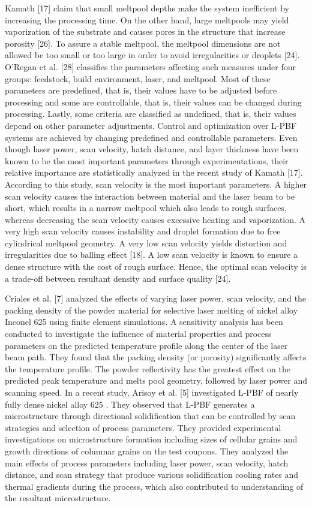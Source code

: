 \documentclass[10pt]{article}
\begin{document}
Kamath [17] claim that small meltpool depths make the system inefficient by increasing the processing time. On the other hand, large meltpools may yield vaporization of the substrate and causes pores in the structure that increase porosity [26]. To assure a stable meltpool, the meltpool dimensions are not allowed be too small or too large in order to avoid irregularities or droplets [24]. O’Regan et al. [28] classifies the parameters affecting such measures under four groups: feedstock, build environment, laser, and meltpool. Most of these parameters are predefined, that is, their values have to be adjusted before processing and some are controllable, that is, their values can be changed during processing. Lastly, some criteria are classified as undefined, that is, their values depend on other parameter adjustments. Control and optimization over L-PBF systems are achieved by changing predefined and controllable parameters. Even though laser power, scan velocity, hatch distance, and layer thickness have been known to be the most important parameters through experimentations, their relative importance are statistically analyzed in the recent study of Kamath [17]. According to this study, scan velocity is the most important parameters. A higher scan velocity causes the interaction between material and the laser beam to be short, which results in a narrow meltpool which also leads to rough surfaces, whereas decreasing the scan velocity causes excessive heating and vaporization. A very high scan velocity causes instability and droplet formation due to free cylindrical meltpool geometry. A very low scan velocity yields distortion and irregularities due to balling effect [18]. A low scan velocity is known to ensure a dense structure with the cost of rough surface. Hence, the optimal scan velocity is a trade-off between resultant density and surface quality [24].

Criales et al. [7] analyzed the effects of varying laser power, scan velocity, and the packing density of the powder material for selective laser melting of nickel alloy Inconel 625 using finite element simulations. A sensitivity analysis has been conducted to investigate the influence of material properties and process parameters on the predicted temperature profile along the center of the laser beam path. They found that the packing density (or porosity) significantly affects the temperature profile. The powder reflectivity has the greatest effect on the predicted peak temperature and melts pool geometry, followed by laser power and scanning speed. In a recent study, Arisoy et al. [5] investigated L-PBF of nearly fully dense nickel alloy 625 . They observed that L-PBF generates a microstructure through directional solidification that can be controlled by scan strategies and selection of process parameters. They provided experimental investigations on microstructure formation including sizes of cellular grains and growth directions of columnar grains on the test coupons. They analyzed the main effects of process parameters including laser power, scan velocity, hatch distance, and scan strategy that produce various solidification cooling rates and thermal gradients during the process, which also contributed to understanding of the resultant microstructure.
\end{document}

